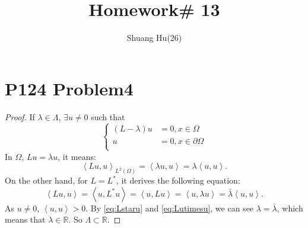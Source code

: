 \documentclass[a4paper]{ctexart}
\title{Homework\# 13}
\author{Shuang Hu(26)}
\newcommand{\innerprod}[2]{\left<#1,#2\right>}
\begin{document}
\maketitle
\section*{P124 Problem4}
\begin{proof}
    If $\lambda\in\Lambda$, $\exists u\neq 0$ such that
    \begin{equation}
        \label{eq:CharacterEq}
        \left\{
            \begin{aligned}
                (L-\lambda)u&=0,x\in\Omega\\
                u&=0,x\in\partial\Omega\\
            \end{aligned}
        \right.
    \end{equation}
    In $\Omega$, $Lu=\lambda u$, it means:
    \begin{equation}
        \label{eq:Lutimesu}
        \innerprod{Lu}{u}_{L^{2}(\Omega)}=\innerprod{\lambda u}{u}=\lambda\innerprod{u}{u}.
    \end{equation}
    On the other hand, for $L=L^{*}$, it derives the following equation:
    \begin{equation}
        \label{eq:Lstaru}
        \innerprod{Lu}{u}=\innerprod{u}{L^{*}u}=\innerprod{u}{Lu}=\innerprod{u}{\lambda u}=\bar{\lambda}\innerprod{u}{u}.
    \end{equation}
    As $u\neq 0$, $\innerprod{u}{u}>0$. By \eqref{eq:Lstaru} and \eqref{eq:Lutimesu}, we can see $\lambda=\bar{\lambda}$, which means that $\lambda\in\mathbb{R}$. So $\Lambda\subset\mathbb{R}$.
\end{proof}
\end{document}
